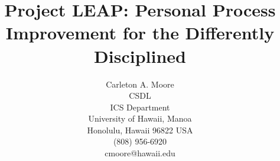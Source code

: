



\title{Project LEAP: Personal Process Improvement for the Differently Disciplined}
\author{
        \hspace*{-2ex}
        \parbox{2.3in} {\begin{center}
        {\authornamefont Carleton A. Moore}\\ 
        CSDL\\
        ICS Department\\
        University of Hawaii, Manoa\\
        Honolulu, Hawaii 96822  USA \\
        (808) 956-6920\\
        cmoore@hawaii.edu
        \end{center} }}
\maketitle
\copyrightspace


